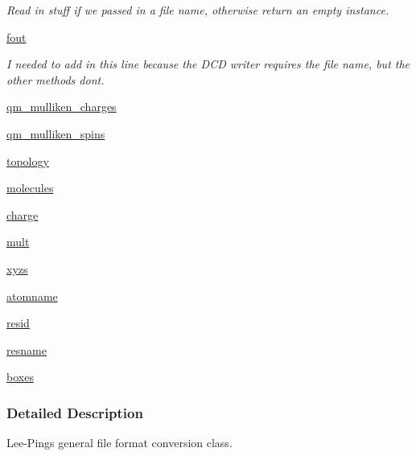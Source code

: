 \begin{DoxyCompactItemize}
\begin{DoxyCompactList}\small\item\em Read in stuff if we passed in a file name, otherwise return an empty instance. \end{DoxyCompactList}\item 
\hyperlink{classsrc_1_1molecule_1_1Molecule_a96266112f8af20de9810e2fee0d5861c}{fout}
\begin{DoxyCompactList}\small\item\em I needed to add in this line because the D\+CD writer requires the file name, but the other methods don\textquotesingle{}t. \end{DoxyCompactList}\item 
\hyperlink{classsrc_1_1molecule_1_1Molecule_ab59ba8cf9a0b9e525428723c813d15c8}{qm\+\_\+mulliken\+\_\+charges}
\item 
\hyperlink{classsrc_1_1molecule_1_1Molecule_abdc7b61bb516d9f57aff156ec09b19bf}{qm\+\_\+mulliken\+\_\+spins}
\item 
\hyperlink{classsrc_1_1molecule_1_1Molecule_aa66fa5839f821805bdd08ed17a206987}{topology}
\item 
\hyperlink{classsrc_1_1molecule_1_1Molecule_a91b5115334f638c29d7a1cc46aedca5d}{molecules}
\item 
\hyperlink{classsrc_1_1molecule_1_1Molecule_a146f60bbab00e12c5754fd666233e86f}{charge}
\item 
\hyperlink{classsrc_1_1molecule_1_1Molecule_aa6fbbf278cf844c7bbdac896c71f5c64}{mult}
\item 
\hyperlink{classsrc_1_1molecule_1_1Molecule_a9701dad854112650bd6b7601cab8b40b}{xyzs}
\item 
\hyperlink{classsrc_1_1molecule_1_1Molecule_afd4c36987dbdc45da729fe1668485628}{atomname}
\item 
\hyperlink{classsrc_1_1molecule_1_1Molecule_a840f24f26e96c001cd36b254c402e481}{resid}
\item 
\hyperlink{classsrc_1_1molecule_1_1Molecule_a346c5b384082c9779f83ea7853a460c8}{resname}
\item 
\hyperlink{classsrc_1_1molecule_1_1Molecule_a996cd83807d88f3fb81aef6278e10051}{boxes}
\end{DoxyCompactItemize}


\subsubsection{Detailed Description}
Lee-\/\+Ping\textquotesingle{}s general file format conversion class. 

